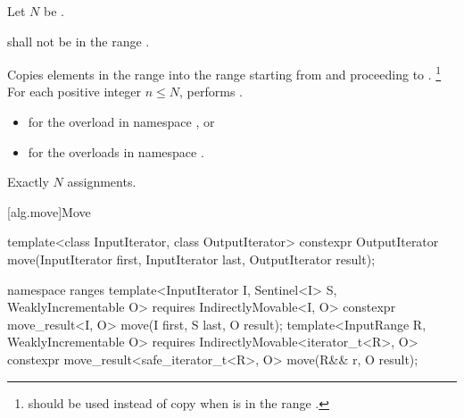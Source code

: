 \begin{itemdescr}
\pnum
Let $N$ be .

\pnum
\requires
{} shall not be in the range .

\pnum
\effects
Copies elements in the range 
into the range 
starting from  and proceeding to .%
\footnote{ should be used instead of copy
when  is in the range .}
For each positive integer $n \le N$,
performs .

\pnum
\returns
\begin{itemize}
\item
  for the overload in namespace , or
\item
  for the overloads in namespace .
\end{itemize}

\pnum
\complexity
Exactly $N$ assignments.
\end{itemdescr}

[alg.move]{Move}

%
\begin{itemdecl}
template<class InputIterator, class OutputIterator>
  constexpr OutputIterator move(InputIterator first, InputIterator last,
                                OutputIterator result);

namespace ranges {
  template<InputIterator I, Sentinel<I> S, WeaklyIncrementable O>
    requires IndirectlyMovable<I, O>
    constexpr move_result<I, O>
      move(I first, S last, O result);
  template<InputRange R, WeaklyIncrementable O>
    requires IndirectlyMovable<iterator_t<R>, O>
    constexpr move_result<safe_iterator_t<R>, O>
      move(R&& r, O result);
}
\end{itemdecl}

